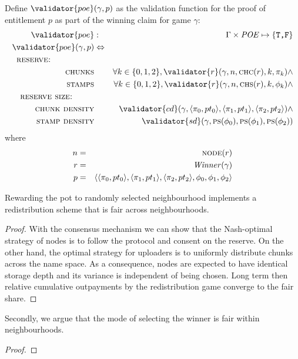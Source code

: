 \begin{definition}
\label{def:claim-validation}
%
Define $\validator{poe}(\gamma, p)$ as the validation function for the proof of entitlement $p$ as part of the winning claim for game $\gamma$:
%
\begin{eqnarray}
\validator{poe}&:&\Gamma\times\mathit{POE}\mapsto\{\texttt{T,F}\}\\
\validator{poe}(\gamma, p) &\Leftrightarrow\\
%
\textsc{reserve:\ \ \ \ \ \ \ \ \ \ \ \ \ \ }\\
\textsc{chunks}
&&\forall k\in\{0,1,2\},\validator{r}(\gamma,n,\textsc{chc}(r),k,\pi_k)\land\\
\textsc{stamps}
&&\forall k\in\{0,1,2\}, \validator{r}(\gamma,n,\textsc{chs}(r),k,\phi_k)\land\\
\textsc{reserve size:\ \ \ \ \ \ \ }\\
\textsc{chunk density}&&\validator{cd}(\gamma, \langle \pi_0,pt_0\rangle, \langle \pi_1,pt_1\rangle, \langle \pi_2,pt_2\rangle)\land\\
%
\textsc{stamp density}&&
\validator{sd}(\gamma,\textsc{ps}(\phi_0),\textsc{ps}(\phi_1),\textsc{ps}(\phi_2))
\end{eqnarray}
where
\begin{eqnarray}
n&=& \textsc{node}(r)\\
r&=& \mathit{Winner}(\gamma)\\
p &= &\langle\langle \pi_0,pt_0\rangle, \langle \pi_1,pt_1\rangle,\langle \pi_2,pt_2\rangle,\phi_0,\phi_1,\phi_2\rangle
\end{eqnarray}
\end{definition}



\begin{corollary}
Rewarding the pot to randomly selected neighbourhood implements a  redistribution scheme that is fair across neighbourhoods.
\begin{proof}
With the consensus mechanism we can show that the Nash-optimal strategy of nodes is to follow the protocol and consent on the reserve. On the other hand, the optimal strategy for uploaders is to uniformly distribute chunks across the name space. As a consequence, nodes are expected to have identical storage depth and its variance is independent of being chosen. Long term then relative cumulative outpayments by the redistribution game converge to the fair share.
\end{proof}

Secondly, we argue that the mode of selecting the winner is fair within neighbourhoods. 
\begin{proof}
    
\end{proof}
\end{corollary}

